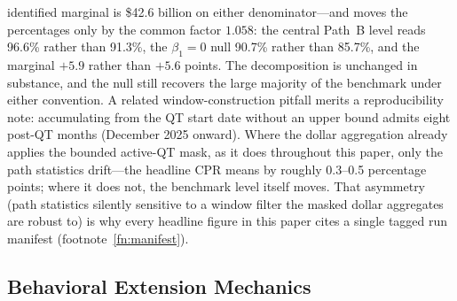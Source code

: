 \documentclass[12pt]{article}
\begin{document}
identified marginal is \$42.6 billion on either denominator---and moves the percentages only by the common factor $1.058$: the central Path~B level reads 96.6\% rather than 91.3\%, the $\beta_1 = 0$ null 90.7\% rather than 85.7\%, and the marginal $+5.9$ rather than $+5.6$ points. The decomposition is unchanged in substance, and the null still recovers the large majority of the benchmark under either convention. A related window-construction pitfall merits a reproducibility note: accumulating from the QT start date without an upper bound admits eight post-QT months (December 2025 onward). Where the dollar aggregation already applies the bounded active-QT mask, as it does throughout this paper, only the path statistics drift---the headline CPR means by roughly 0.3--0.5 percentage points; where it does not, the benchmark level itself moves. That asymmetry (path statistics silently sensitive to a window filter the masked dollar aggregates are robust to) is why every headline figure in this paper cites a single tagged run manifest (footnote~\ref{fn:manifest}).

\subsection{Behavioral Extension Mechanics}\label{sec:robustness-extensions}
\end{document}
